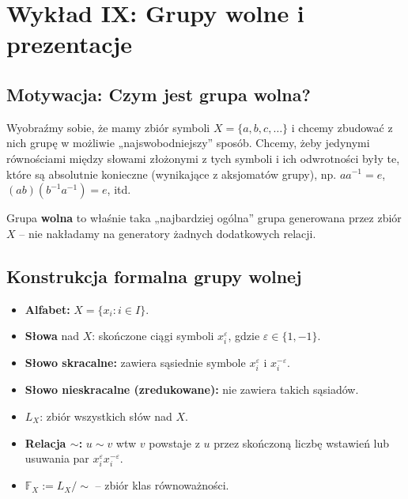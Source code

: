 \chapter{Wykład IX: Grupy wolne i prezentacje}

\section{Motywacja: Czym jest grupa wolna?}

\begin{intuition}
    Wyobraźmy sobie, że mamy zbiór symboli $X = \{a, b, c, \dots\}$ i chcemy zbudować z nich grupę w możliwie „najswobodniejszy” sposób. Chcemy, żeby jedynymi równościami między słowami złożonymi z tych symboli i ich odwrotności były te, które są absolutnie konieczne (wynikające z aksjomatów grupy), np. $aa^{-1} = e$, $(ab)(b^{-1}a^{-1}) = e$, itd. 
    
    Grupa \textbf{wolna} to właśnie taka „najbardziej ogólna” grupa generowana przez zbiór $X$ – nie nakładamy na generatory żadnych dodatkowych relacji.
\end{intuition}

\section{Konstrukcja formalna grupy wolnej}

\begin{definition}
    \begin{itemize}
        \item \textbf{Alfabet:} $X = \{x_i : i \in I\}$.
        \item \textbf{Słowa} nad $X$: skończone ciągi symboli $x_i^{\varepsilon}$, gdzie $\varepsilon \in \{1, -1\}$.
        \item \textbf{Słowo skracalne:} zawiera sąsiednie symbole $x_i^{\varepsilon}$ i $x_i^{-\varepsilon}$.
        \item \textbf{Słowo nieskracalne (zredukowane):} nie zawiera takich sąsiadów.
        \item $L_X$: zbiór wszystkich słów nad $X$.
        \item \textbf{Relacja $\sim$:} $u \sim v$ wtw $v$ powstaje z $u$ przez skończoną liczbę wstawień lub usuwania par $x_i^{\varepsilon}x_i^{-\varepsilon}$.
        \item $\mathbb{F}_X := L_X/{\sim}$ – zbiór klas równoważności.
    \end{itemize}
\end{definition}

